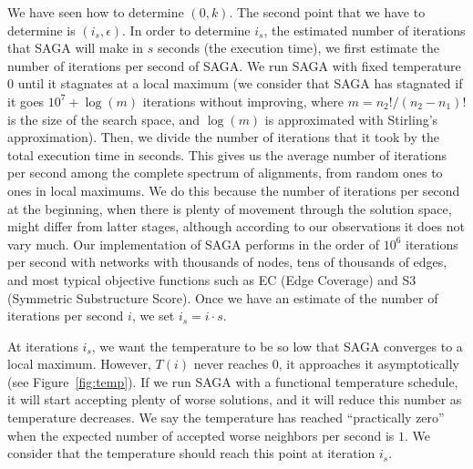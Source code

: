 \documentclass[]{article}
\begin{document}
We have seen how to determine $(0,k)$. The second point that we have to determine is $(i_s,\epsilon)$. In order to determine $i_s$, the estimated number of iterations that SAGA will make in $s$ seconds (the execution time), we first estimate the number of iterations per second of SAGA. We run SAGA with fixed temperature $0$ until it stagnates at a local maximum (we consider that SAGA has stagnated if it goes $10^7+\log(m)$ iterations without improving, where $m={n_2!}/{(n_2-n_1)!}$ is the size of the search space, and $\log(m)$ is approximated with Stirling's approximation). Then, we divide the number of iterations that it took by the total execution time in seconds. This gives us the average number of iterations per second among the complete spectrum of alignments, from random ones to ones in local maximums. We do this because the number of iterations per second at the beginning, when there is plenty of movement through the solution space, might differ from latter stages, although according to our observations it does not vary much. Our implementation of SAGA performs in the order of $10^6$ iterations per second with networks with thousands of nodes, tens of thousands of edges, and most typical objective functions such as EC (Edge Coverage) and S3 (Symmetric Substructure Score). Once we have an estimate of the number of iterations per second $i$, we set $i_s=i\cdot s$.

At iterations $i_s$, we want the temperature to be so low that SAGA converges to a local maximum. However, $T(i)$ never reaches $0$, it approaches it asymptotically (see Figure~\ref{fig:temp}). If we run SAGA with a functional temperature schedule, it will start accepting plenty of worse solutions, and it will reduce this number as temperature decreases. We say the temperature has reached ``practically zero'' when the expected number of accepted worse neighbors per second is $1$. We consider that the temperature should reach this point at iteration $i_s$.
\end{document}
